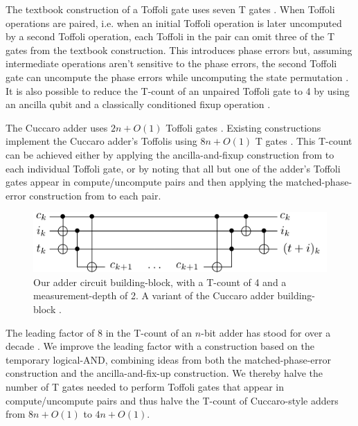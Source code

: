 \documentclass[twocolumn]{quantumarticle-customized}
\begin{document}
The textbook construction of a Toffoli gate uses seven T gates \cite{Nielsen2009}.
When Toffoli operations are paired, i.e. when an initial Toffoli operation is later uncomputed by a second Toffoli operation, each Toffoli in the pair can omit three of the T gates from the textbook construction.
This introduces phase errors but, assuming intermediate operations aren't sensitive to the phase errors, the second Toffoli gate can uncompute the phase errors while uncomputing the state permutation \cite{Barenco1995, Nielsen2009}.
It is also possible to reduce the T-count of an unpaired Toffoli gate to 4 by using an ancilla qubit and a classically conditioned fixup operation \cite{Jones2013}.

The Cuccaro adder uses $2n + O(1)$ Toffoli gates \cite{Cuccaro2004}.
Existing constructions implement the Cuccaro adder's Toffolis using $8n + O(1)$ T gates \cite{Barenco1995, Cuccaro2004, Amy2013}.
This T-count can be achieved either by applying the ancilla-and-fixup construction from \cite{Jones2013} to each individual Toffoli gate, or by noting that all but one of the adder's Toffoli gates appear in compute/uncompute pairs and then applying the matched-phase-error construction from \cite{Barenco1995, Nielsen2009} to each pair.

\begin{figure}
  \includegraphics[width=\linewidth]{adder-building-block.pdf}
  \caption{
	Our adder circuit building-block, with a T-count of 4 and a measurement-depth of 2.
	A variant of the Cuccaro adder building-block \cite{Cuccaro2004}.
  }
  \label{fig:adder-building-block}
\end{figure}

The leading factor of 8 in the T-count of an $n$-bit adder has stood for over a decade \cite{Barenco1995, Cuccaro2004, AustinDiscussionsAndEmails2017}.
We improve the leading factor with a construction based on the temporary logical-AND, combining ideas from both the matched-phase-error construction and the ancilla-and-fix-up construction.
We thereby halve the number of T gates needed to perform Toffoli gates that appear in compute/uncompute pairs and thus halve the T-count of Cuccaro-style adders from $8n + O(1)$ to $4n + O(1)$.
\end{document}

